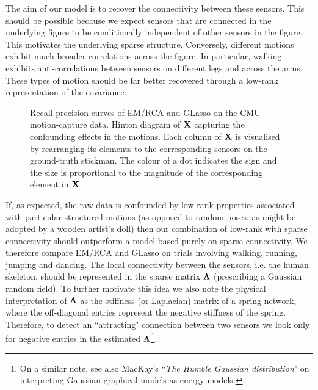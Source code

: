         The aim of our model is to recover the connectivity between these sensors. This should be possible because we expect sensors that are connected in the underlying figure to be conditionally independent of other sensors in the figure. This motivates the underlying sparse structure. Conversely, different motions exhibit much broader correlations across the figure. In particular, walking exhibits anti-correlations between sensors on different legs and across the arms. These types of motion should be far better recovered through a low-rank representation of the covariance.

        \begin{figure}[!htbp]
	\centering
	\caption[Recall-precision curves on the CMU motion-capture dataset.]{ 
	  Recall-precision curves of EM/RCA and GLasso on the CMU motion-capture data.  Hinton diagram of $\mathbf{X}$ capturing the confounding effects in the motions. Each column of $\mathbf{X}$ is visualised by rearranging its elements to the corresponding sensors on the ground-truth stickman. The colour of a dot indicates the sign and the size is proportional to the magnitude of the corresponding element in $\mathbf{X}$.}
	\label{fig:EMRCAcmudata}
        \end{figure}
      
        If, as expected, the raw data is confounded by low-rank properties associated with particular structured motions (as opposed to random poses, as might be adopted by a wooden artist's doll) then our combination of low-rank with sparse connectivity should outperform a model based purely on sparse connectivity. We therefore compare EM/RCA and GLasso on trials involving walking, running, jumping and dancing. The local connectivity between the sensors, i.e. the human skeleton, should be represented in the sparse matrix $\mathbf{\Lambda}$ (prescribing a Gaussian random field). To further motivate this idea we also note the physical interpretation of $\mathbf{\Lambda}$ as the stiffness (or Laplacian) matrix of a spring network, where the off-diagonal entries represent the negative stiffness of the spring. Therefore, to detect an ``attracting" connection between two sensors we look only for negative entries in the estimated $\mathbf{\Lambda}$\footnote{On a similar note, see also MacKay's ``\emph{The Humble Gaussian distribution}" 
on interpreting Gaussian graphical models as energy models.}.
       
